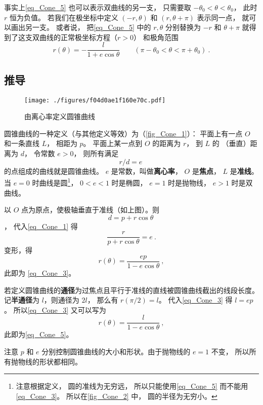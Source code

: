 事实上\autoref{eq_Cone_5} 也可以表示双曲线的另一支， 只需要取 $-\theta_0< \theta < \theta_0$， 此时 $r$ 恒为负值。 若我们在极坐标中定义 $(-r, \theta)$ 和 $(r, \theta + \pi)$ 表示同一点， 就可以画出另一支。 或者说， 把\autoref{eq_Cone_5} 中的  $r,\theta$ 分别替换为 $-r$ 和 $\theta+\pi$ 就得到了这支双曲线的正常极坐标方程（$r > 0$） 和极角范围
\begin{equation}\label{eq_Cone_6}
r(\theta) = -\frac{l}{1 + e\cos\theta} \qquad (\pi - \theta_0<\theta < \pi + \theta_0)~.
\end{equation}

\subsection{推导}

\begin{figure}[ht]
\centering
\texttt{[image: ./figures/f04d0ae1f160e70c.pdf]}
\caption{由离心率定义圆锥曲线}\label{fig_Cone_1}
\end{figure}

圆锥曲线的一种定义（与其他定义等效）为（\autoref{fig_Cone_1}）：
平面上有一点 $O$ 和一条直线 $L$， 相距为 $p$。 
平面上某一点到 $O$ 的距离为 $r$， 到 $L$ 的
（垂直）距离为 $d$， 令常数 $e > 0$， 则所有满足
\begin{equation}\label{eq_Cone_1}
r/d = e~
\end{equation}
的点组成的曲线就是圆锥曲线。 $e$ 是常数，叫做\textbf{离心率}， $O$ 是\textbf{焦点}， $L$ 是\textbf{准线}。 当 $e = 0$ 时曲线是圆\footnote{注意根据定义， 圆的准线为无穷远， 所以只能使用\autoref{eq_Cone_5} 而不能用\autoref{eq_Cone_3}。 所以在\autoref{fig_Cone_2} 中， 圆的半径为无穷小。}， $0 < e < 1$ 时是椭圆， $e = 1$ 时是抛物线， $e > 1$ 时是双曲线。

以 $O$ 点为原点，使极轴垂直于准线（如上图）。则 $$d = p + r \cos \theta ~$$， 代入\autoref{eq_Cone_1} 得
\begin{equation}\label{eq_Cone_2}
\frac{r}{p + r \cos \theta } = e~.
\end{equation}
变形，得
\begin{equation}
r(\theta) = \frac{ep}{1 - e\cos \theta }~,
\end{equation}
此即为 \autoref{eq_Cone_3}。

若定义圆锥曲线的\textbf{通径}为过焦点且平行于准线的直线被圆锥曲线截出的线段长度。 记\textbf{半通径}为 $l$，则通径为 $2l$， 那么有 $r(\pi /2) = l$。 代入\autoref{eq_Cone_3} 得 $l = ep$。 所以\autoref{eq_Cone_3} 又可以写为
\begin{equation}\label{eq_Cone_4}
r(\theta)  = \frac{l}{1 - e\cos \theta }~,
\end{equation}
此即为\autoref{eq_Cone_5}。

注意 $p$ 和 $e$ 分别控制圆锥曲线的大小和形状。由于抛物线的 $e = 1$ 不变， 所以所有抛物线的形状都相同。
